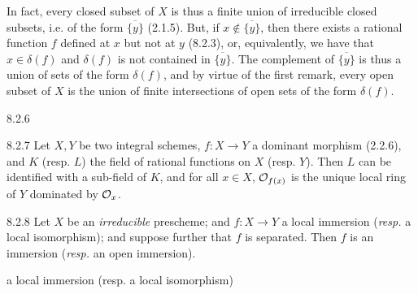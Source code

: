 \documentclass[../main.tex]{subfiles}
\begin{document}
In fact, every closed subset of $X$ is thus a finite union of irreducible closed subsets, i.e. of the form $\overline{\{y\}}$ (2.1.5).
But, if $x\not\in\overline{\{y\}}$, then there exists a rational function $f$ defined at $x$ but not at $y$ (8.2.3), or, equivalently, we have that $x\in\delta(f)$ and $\delta(f)$ is not contained in $\overline{\{y\}}$.
The complement  of $\overline{\{y\}}$ is thus a union of sets of the form $\delta(f)$, and by virtue of the first remark, every open subset of $X$ is the union of finite intersections of open sets of the form $\delta(f)$.

\begin{cx}{8.2.6}
\end{cx}

\begin{cx}[Proposition]{8.2.7}
    Let $X,Y$ be two integral schemes, $f\colon X\to Y$ a dominant morphism (2.2.6), and $K$ (resp. $L$) the field of rational functions on $X$ (resp. $Y$).
    Then $L$ can be identified with a sub-field of $K$, and for all $x\in X$, $\mathcal{O}_{f(x)}$ is the unique local ring of $Y$ dominated by $\mathcal{O}_x$.
\end{cx}

\begin{cx}[Proposition]{8.2.8}
    Let $X$ be an \emph{irreducible} prescheme; and $f\colon X\to Y$ a local immersion (\emph{resp.} a local isomorphism); and suppose further that $f$ is separated.
    Then $f$ is an immersion (\emph{resp.} an open immersion).
\end{cx}

a local immersion (resp. a local isomorphism)

\end{document}
